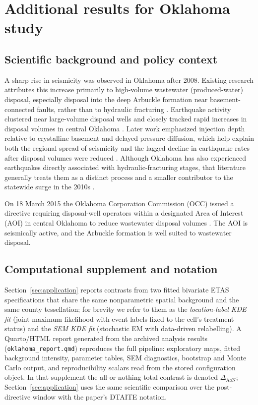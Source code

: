 \documentclass{statsoc}
\newcommand{\1}{\mathbbm{1}}
\begin{document}
\section{Additional results for Oklahoma study}\label{sec:additional_application}

\subsection{Scientific background and policy context}\label{sec:ok_background}

A sharp rise in seismicity was observed in Oklahoma after 2008. Existing research attributes this increase primarily to high-volume wastewater (produced-water) disposal, especially disposal into the deep Arbuckle formation near basement-connected faults, rather than to hydraulic fracturing \citep{WeingartenEtAl2015}. %
Earthquake activity clustered near large-volume disposal wells and closely tracked rapid increases in disposal volumes in central Oklahoma \citep{WalshZoback2015}. Later work emphasized injection depth relative to crystalline basement and delayed pressure diffusion, which help explain both the regional spread of seismicity and the lagged decline in earthquake rates after disposal volumes were reduced \citep{Hincks2018}.%
Although Oklahoma has also experienced earthquakes directly associated with hydraulic-fracturing stages, that literature generally treats them as a distinct process and a smaller contributor to the statewide surge in the 2010s \citep{RubinsteinMahani2015,SkoumalEtAl2018}.

On 18 March 2015 the Oklahoma Corporation Commission (OCC) issued a directive requiring disposal-well operators within a designated Area of Interest (AOI) in central Oklahoma to reduce wastewater disposal volumes . The AOI is seismically active, and the Arbuckle formation is well suited to wastewater disposal.

\subsection{Computational supplement and notation}\label{sec:ok_computational}
Section~\ref{sec:application} reports contrasts from two fitted bivariate ETAS specifications that share the same nonparametric spatial background and the same county tessellation; for brevity we refer to them as the \emph{location-label KDE fit} (joint maximum likelihood with event labels fixed to the cell's treatment status) and the \emph{SEM KDE fit} (stochastic EM with data-driven relabelling). A Quarto/HTML report generated from the archived analysis results (\verb|oklahoma_report.qmd|) reproduces the full pipeline: exploratory maps, fitted background intensity, parameter tables, SEM diagnostics, bootstrap and Monte Carlo output, and reproducibility scalars read from the stored configuration object. In that supplement the all-or-nothing total contrast is denoted $\Delta_{\mathrm{AoN}}$; Section~\ref{sec:application} uses the same scientific comparison over the post-directive window with the paper's DTAITE notation.
\end{document}
